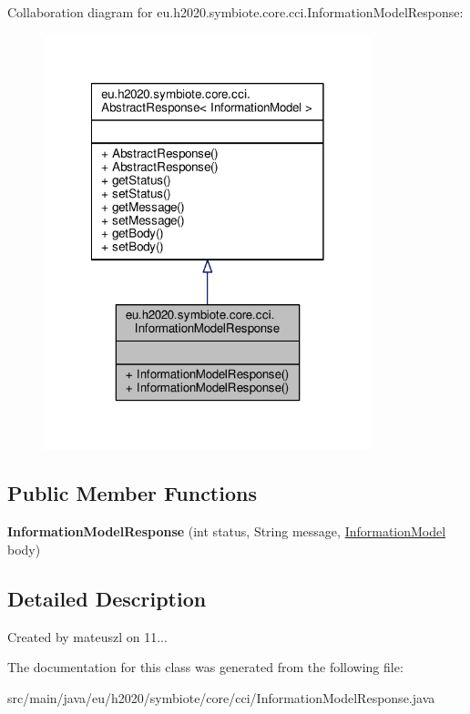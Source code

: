 Collaboration diagram for eu.\+h2020.\+symbiote.\+core.\+cci.\+Information\+Model\+Response\+:\nopagebreak
\begin{figure}[H]
\begin{center}
\leavevmode
\includegraphics[width=270pt]{classeu_1_1h2020_1_1symbiote_1_1core_1_1cci_1_1InformationModelResponse__coll__graph}
\end{center}
\end{figure}
\subsection*{Public Member Functions}
\begin{DoxyCompactItemize}
\item 
\mbox{\label{classeu_1_1h2020_1_1symbiote_1_1core_1_1cci_1_1InformationModelResponse_a8f66ee2c240126780a1a596199e7f965}} 
{\bfseries Information\+Model\+Response} (int status, String message, \hyperlink{classeu_1_1h2020_1_1symbiote_1_1model_1_1mim_1_1InformationModel}{Information\+Model} body)
\end{DoxyCompactItemize}


\subsection{Detailed Description}
Created by mateuszl on 11... 

The documentation for this class was generated from the following file\+:\begin{DoxyCompactItemize}
\item 
src/main/java/eu/h2020/symbiote/core/cci/Information\+Model\+Response.\+java\end{DoxyCompactItemize}
